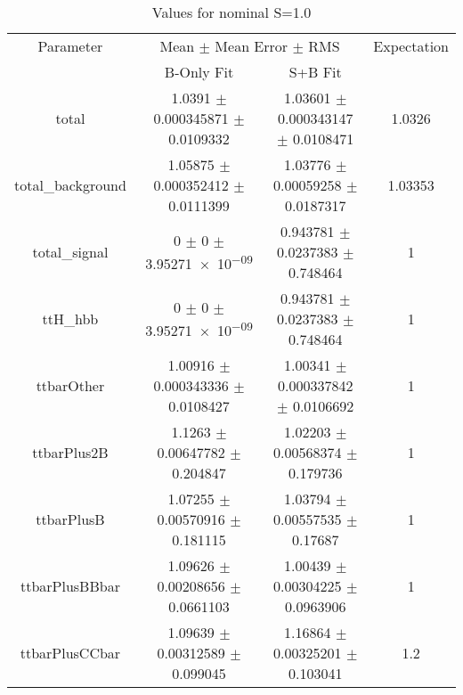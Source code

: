 \begin{table}
\centering
\caption{Values for nominal S=1.0}
\begin{tabular}{cccc}
\toprule
Parameter & \multicolumn{2}{c}{Mean $\pm$ Mean Error $\pm$ RMS} & Expectation\\
 & B-Only Fit & S+B Fit & \\
\midrule
total & \num{1.0391} $\pm$ \num{0.000345871} $\pm$ \num{0.0109332} & \num{1.03601} $\pm$ \num{0.000343147} $\pm$ \num{0.0108471} & \num{1.0326}\\
total\_background & \num{1.05875} $\pm$ \num{0.000352412} $\pm$ \num{0.0111399} & \num{1.03776} $\pm$ \num{0.00059258} $\pm$ \num{0.0187317} & \num{1.03353}\\
total\_signal & \num{0} $\pm$ \num{0} $\pm$ \num{3.95271e-09} & \num{0.943781} $\pm$ \num{0.0237383} $\pm$ \num{0.748464} & \num{1}\\
ttH\_hbb & \num{0} $\pm$ \num{0} $\pm$ \num{3.95271e-09} & \num{0.943781} $\pm$ \num{0.0237383} $\pm$ \num{0.748464} & \num{1}\\
ttbarOther & \num{1.00916} $\pm$ \num{0.000343336} $\pm$ \num{0.0108427} & \num{1.00341} $\pm$ \num{0.000337842} $\pm$ \num{0.0106692} & \num{1}\\
ttbarPlus2B & \num{1.1263} $\pm$ \num{0.00647782} $\pm$ \num{0.204847} & \num{1.02203} $\pm$ \num{0.00568374} $\pm$ \num{0.179736} & \num{1}\\
ttbarPlusB & \num{1.07255} $\pm$ \num{0.00570916} $\pm$ \num{0.181115} & \num{1.03794} $\pm$ \num{0.00557535} $\pm$ \num{0.17687} & \num{1}\\
ttbarPlusBBbar & \num{1.09626} $\pm$ \num{0.00208656} $\pm$ \num{0.0661103} & \num{1.00439} $\pm$ \num{0.00304225} $\pm$ \num{0.0963906} & \num{1}\\
ttbarPlusCCbar & \num{1.09639} $\pm$ \num{0.00312589} $\pm$ \num{0.099045} & \num{1.16864} $\pm$ \num{0.00325201} $\pm$ \num{0.103041} & \num{1.2}\\
\bottomrule
\end{tabular}
\end{table}